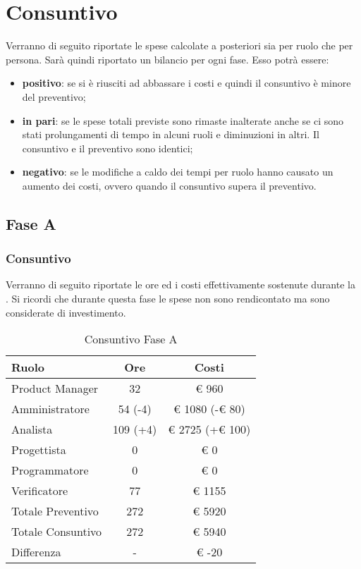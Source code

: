 \section{Consuntivo}
	Verranno di seguito riportate le spese calcolate a posteriori sia per ruolo che per persona.
	Sarà quindi riportato un bilancio per ogni fase. Esso potrà essere:
	\begin{itemize}
		\item \textbf{positivo}: se si è riusciti ad abbassare i costi e quindi il consuntivo è minore del preventivo;
		\item \textbf{in pari}: se le spese totali previste sono rimaste inalterate anche se ci sono stati prolungamenti di tempo in alcuni ruoli e diminuzioni in altri. Il consuntivo e il preventivo sono identici;
		\item \textbf{negativo}: se le modifiche a caldo dei tempi per ruolo hanno causato un aumento dei costi, ovvero quando il consuntivo supera il preventivo.
	\end{itemize}
	\subsection{Fase A}
		\subsubsection{Consuntivo}
			Verranno di seguito riportate le ore ed i costi effettivamente sostenute durante la . Si ricordi che durante questa fase le spese non sono rendicontato ma sono considerate di investimento.
			\begin{table}[H]
					\begin{center}
						\begin{tabular}{| l | c | c |}
							\hline
							Ruolo 			& Ore 	& Costi  \\ \hline
							
							Product Manager	& 32 		& \euro{} 960 	\\
							Amministratore 		& 54 	(-4)	& \euro{} 1080 (-\euro{} 80)	\\
							Analista	 		& 109 (+4)& \euro{} 2725 (+\euro{} 100)	\\
							Progettista 		& 0		& \euro{} 0 	\\
							Programmatore		& 0		& \euro{} 0	\\
							Verificatore		& 77		& \euro{} 1155 	\\ \hline \hline
							
							Totale Preventivo	& 272 	& \euro{} 5920 	\\ \hline
							Totale Consuntivo	& 272 	& \euro{} 5940 	\\ \hline
							Differenza			& - 		& \euro{} -20 	\\ \hline
						\end{tabular}
					\end{center}
					\caption{Consuntivo Fase A}
				\end{table}

